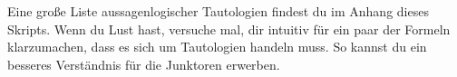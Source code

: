  
 

\begin{bem}[*]
 Eine große Liste aussagenlogischer Tautologien findest du im Anhang dieses Skripts. Wenn du Lust hast, versuche mal, dir intuitiv für ein paar der Formeln klarzumachen, dass es sich um Tautologien handeln muss. So kannst du ein besseres Verständnis für die Junktoren erwerben.
\end{bem}

 
 

\begin{comment}
\begin{bem}
Besonders erwähnenswerte Tautologien aus dieser Liste sind die folgenden:
\begin{align*}
     A & \leftrightarrow \neg\neg A && (\text{Regel der doppelten Verneinung}) \\[1em]
            \begin{split} ( \neg A \land \neg B) & \leftrightarrow \neg (A \lor B) \\
  (\neg A \lor \neg B) & \leftrightarrow \neg(A \land B) 
  \end{split} && (\text{Regeln von De Morgan}) \\[1em]
    \neg (A\to B) & \leftrightarrow (A \land \neg B) \\
     (A\to B) & \leftrightarrow (\neg A \lor B)
\end{align*}
Die ersten vier Formeln erlauben es, Negationen „in Formeln hineinzuziehen“, ohne ihren Wahrheitswert zu verändern. Au diese Weise kann jede mit Junktoren verschachtelte Aussage bei gleichbleibendem Wahrheitswert so „umgeformt“ werden. Die letzte Formel ermöglicht es Implikationspfeile in Oder-Aussagen „umzuformen“. Hier ist ein Beispiel für eine Umformung der Kontrapositionsformel in eine Formel, die nur noch die Junktoren $\neg$, $\land$ und $\lor$ enthält:
\begin{align*}
 (A\to B)\to (\neg B\to \neg A) & \Leftrightarrow  (\neg A\lor B) \to (\neg\neg B\lor\neg A) \\
 & \Leftrightarrow \neg(\neg A\lor B) \lor (B\lor \neg A) \\
 & \Leftrightarrow (\neg \neg A\land \neg B) \lor (B\lor \neg A) \\
 & \Leftrightarrow (A\land \neg V) \lor B\lor \neg A
\end{align*}
\end{bem}





\end{comment}
